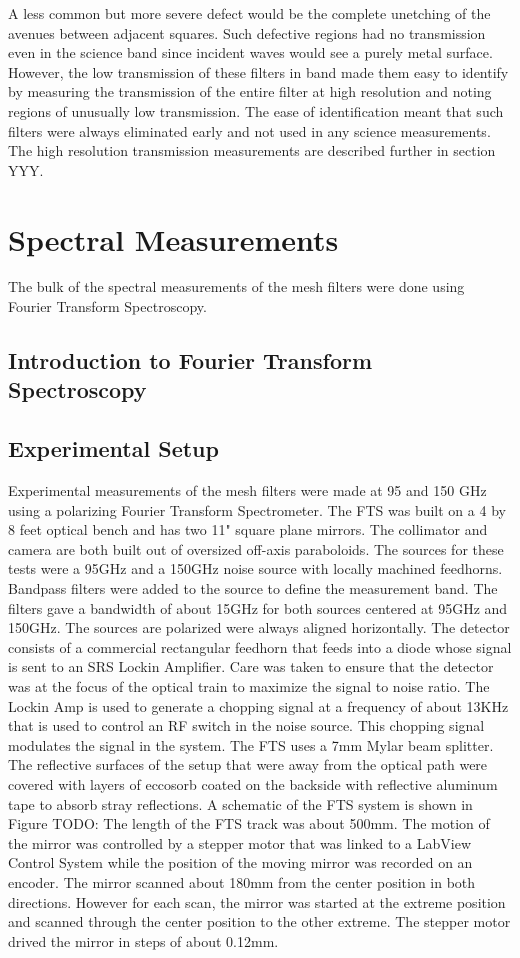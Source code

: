 \documentclass[12pt]{article}
\begin{document}
A less common but more severe defect would be the complete unetching of the avenues between adjacent squares. Such defective regions had no transmission even in the science band since incident waves would see a purely metal surface. However, the low transmission of these filters in band made them easy to identify by measuring the transmission of the entire filter at high resolution and noting regions of unusually low transmission. The ease of identification meant that such filters were always eliminated early and not used in any science measurements. The high resolution transmission measurements are described further in section YYY.


\section{Spectral Measurements}
The bulk of the spectral measurements of the mesh filters were done using
Fourier Transform Spectroscopy.

\subsection{Introduction to Fourier Transform Spectroscopy}


\subsection{Experimental Setup}
Experimental measurements of the mesh filters were made at 95 and 150 GHz using
a polarizing Fourier Transform Spectrometer. The FTS was built on a 4 by 8 feet
optical bench and has two 11" square plane mirrors. The collimator and camera
are both built out of oversized off-axis paraboloids. The sources for these tests
were a 95GHz and a 150GHz noise source with locally machined feedhorns. Bandpass
filters were added to the source to define the measurement band. The filters
gave a bandwidth of about 15GHz for both sources centered at 95GHz and 150GHz.  The
sources are polarized were always aligned horizontally. The detector consists of a commercial rectangular
feedhorn that feeds into a diode whose signal is sent to an SRS Lockin
Amplifier. Care was taken to ensure that the detector was at the focus of the
optical train to maximize the signal to noise ratio. The Lockin Amp is used to generate a chopping signal at a frequency
of about 13KHz that is used to control an RF switch in the noise source. This
chopping signal modulates the signal in the system. The FTS uses a 7mm Mylar
beam splitter. The reflective surfaces of the setup that were away from the
optical path were covered with layers of eccosorb coated on the backside with
reflective aluminum tape to absorb stray reflections. A schematic of the FTS
system is shown in Figure TODO: The length of the FTS track was about 500mm. The
motion of the mirror was controlled by a stepper motor that was linked to a
LabView Control System while the position of the moving mirror was recorded on
an encoder. The mirror scanned about 180mm from the center position in both
directions. However for each scan, the mirror was started at the extreme
position and scanned through the center position to the other extreme. The
stepper motor drived the mirror in steps of about 0.12mm. 
\end{document}
